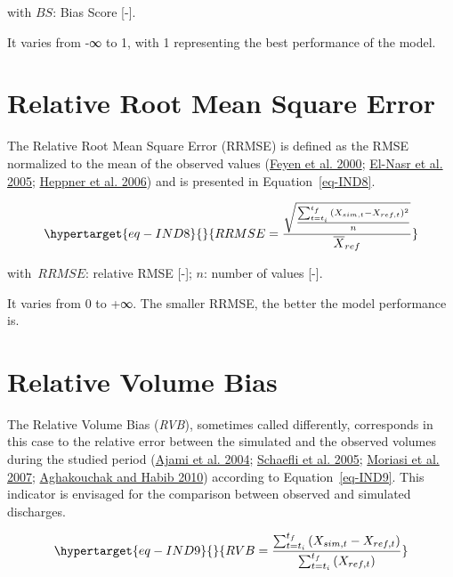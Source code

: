 \documentclass[
  letterpaper,
  DIV=11,
  numbers=noendperiod]{scrreprt}
\begin{document}
with \(BS\): Bias Score {[}-{]}.

It varies from -∞ to 1, with 1 representing the best performance of the
model.

\hypertarget{sec-tech_performance_indicators_rrmse}{%
\chapter{Relative Root Mean Square
Error}\label{sec-tech_performance_indicators_rrmse}}

The Relative Root Mean Square Error (RRMSE) is defined as the RMSE
normalized to the mean of the observed values
(\protect\hyperlink{ref-feyen_application_2000}{Feyen et al. 2000};
\protect\hyperlink{ref-el-nasr_modelling_2005}{El-Nasr et al. 2005};
\protect\hyperlink{ref-heppner_adding_2006}{Heppner et al. 2006}) and is
presented in Equation~\ref{eq-IND8}.

\begin{equation}\protect\hypertarget{eq-IND8}{}{
RRMSE = \frac{\sqrt{\frac{\sum_{t = t_{i}}^{t_{f}}{(X_{sim,t} - X_{ref,t})^{2}}}{n}}}{{\overline{X}}_{ref}}
}\label{eq-IND8}\end{equation}

with~\(RRMSE\): relative RMSE {[}-{]}; \(n\): number of values {[}-{]}.

It varies from 0 to +∞. The smaller RRMSE, the better the model
performance is.

\hypertarget{sec-tech_performance_indicators_rvb}{%
\chapter{Relative Volume
Bias}\label{sec-tech_performance_indicators_rvb}}

The Relative Volume Bias (\emph{RVB}), sometimes called differently,
corresponds in this case to the relative error between the simulated and
the observed volumes during the studied period
(\protect\hyperlink{ref-ajami_calibration_2004}{Ajami et al. 2004};
\protect\hyperlink{ref-schaefli_conceptual_2005}{Schaefli et al. 2005};
\protect\hyperlink{ref-moriasi_model_2007}{Moriasi et al. 2007};
\protect\hyperlink{ref-aghakouchak_application_2010}{Aghakouchak and
Habib 2010}) according to Equation~\ref{eq-IND9}. This indicator is
envisaged for the comparison between observed and simulated discharges.

\begin{equation}\protect\hypertarget{eq-IND9}{}{
RVB = \frac{\sum_{t = t_{i}}^{t_{f}}{(X_{sim,t} - X_{ref,t})}}{\sum_{t = t_{i}}^{t_{f}}{(X_{ref,t})}}
}\label{eq-IND9}\end{equation}
\end{document}
